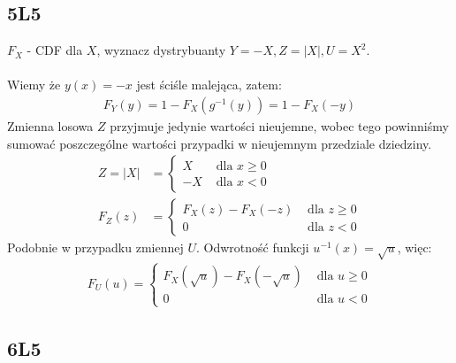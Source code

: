 \documentclass{article}
\begin{document}
\subsection{5L5}

$F_X$ - CDF dla $X$, wyznacz dystrybuanty $Y=-X, Z=|X|, U=X^2$.\\\\
\noindent
Wiemy że $y(x)=-x$ jest ściśle malejąca, zatem:
\setcounter{equation}{0}
\begin{align}
    F_Y(y)=1-F_X(g^{-1}(y))=1-F_X(-y)
\end{align}
Zmienna losowa $Z$ przyjmuje jedynie wartości nieujemne, wobec tego powinniśmy sumować poszczególne wartości przypadki w nieujemnym przedziale dziedziny.
\begin{align}
    Z = |X| &= \begin{cases}
        X &\text{ dla } x\geq 0\\
        -X &\text{ dla } x < 0
    \end{cases}\\
    F_Z(z) &= \begin{cases}
        F_X(z) - F_X(-z) &\text{ dla } z\geq 0\\
        0 &\text{ dla } z < 0
    \end{cases}
\end{align}
Podobnie w przypadku zmiennej $U$. Odwrotność funkcji $u^{-1}(x) = \sqrt{u}$, więc:
\begin{align}
    F_U(u) = \begin{cases}
        F_X(\sqrt{u}) - F_X(-\sqrt{u}) &\text{ dla } u\geq 0\\
        0 &\text{ dla } u < 0
    \end{cases}
\end{align}

\newpage

\subsection{6L5}
\end{document}
